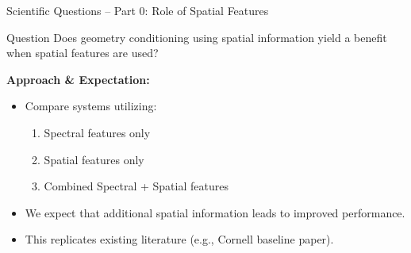 \documentclass[8pt,hyperref={pdfpagelabels=true},xcolor=table,aspectratio=169]{beamer}
\begin{document}
\begin{frame}{Scientific Questions -- Part 0: Role of Spatial Features}
    \begin{block}{Question}
        Does geometry conditioning using spatial information yield a benefit when spatial features are used?
    \end{block}
    \vspace{1em}
    \textbf{Approach \& Expectation:}
    \begin{itemize}
        \item Compare systems utilizing:
              \begin{enumerate}
                  \item Spectral features only
                  \item Spatial features only
                  \item Combined Spectral + Spatial features
              \end{enumerate}
        \item We expect that additional spatial information leads to improved performance.
        \item This replicates existing literature (e.g., Cornell baseline paper).
    \end{itemize}
\end{frame}
\end{document}
